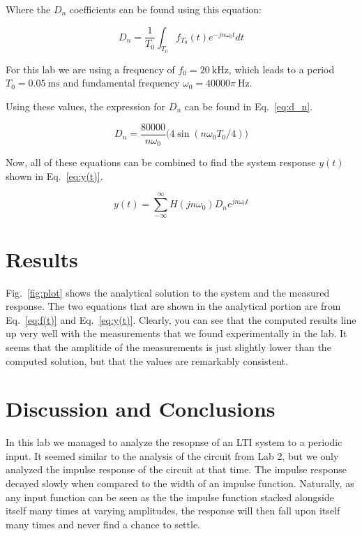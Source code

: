 \documentclass[11pt]{texMemo-gibbons}
\begin{document}
Where the $D_n$ coefficients can be found using this equation:

\[
  D_n = \frac{1}{T_0} \int_{T_0}f_{T_0}(t) e^{-jn\omega_0 t} dt
\]

For this lab we are using a frequency of $f_0=20~\si{\kHz}$,
which leads to a period $T_0 = 0.05~\si{\ms}$ and fundamental
frequency $\omega_0 = 40000 \pi~\si{\Hz}$. 

Using these values, the expression for $D_n$ can be found in 
Eq.~\ref{eq:d_n}.

\begin{equation}
  D_n = \frac{80000}{n\omega_0} \big( 4 \sin (n \omega_0 T_0 / 4) \big)
  \label{eq:d_n}
\end{equation}

Now, all of these equations can be combined to find the system response $y(t)$
shown in Eq.~\ref{eq:y(t)}.

\begin{equation}
  y(t) = \sum _{-\infty}^{\infty} H(jn\omega_0) D_n e^{jn\omega_0 t}
  \label{eq:y(t)}
\end{equation}

\section{Results}
\label{sec:results}

Fig.~\ref{fig:plot} shows the analytical solution to
the system and the measured response. The two equations
that are shown in the analytical portion are from Eq.~\ref{eq:f(t)}
and Eq.~\ref{eq:y(t)}. Clearly, you can see that the
computed results line up very well with the measurements
that we found experimentally in the lab. It seems that the 
amplitide of the measurements is just slightly lower than
the computed solution, but that the values are remarkably
consistent.

\section{Discussion and Conclusions}
\label{sec:conclusions}

In this lab we managed to analyze the resopnse of an
LTI system to a periodic input. It seemed similar to
the analysis of the circuit from Lab 2, but we only
analyzed the impulse response of the circuit at that
time. The impulse response decayed slowly when compared
to the width of an impulse function. Naturally, as any
input function can be seen as the the impulse function
stacked alongside itself many times at varying amplitudes,
the response will then fall upon itself many times and
never find a chance to settle.
\end{document}
